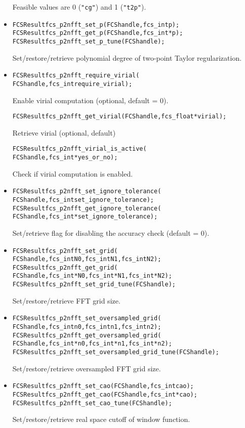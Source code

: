 \begin{itemize}
    Feasible values are 0 (\verb!"cg"!) and 1 (\verb!"t2p"!).
  \item
\begin{alltt}
FCSResult fcs_p2nfft_set_p(FCS handle, fcs_int p);
FCSResult fcs_p2nfft_get_p(FCS handle, fcs_int* p);
FCSResult fcs_p2nfft_set_p_tune(FCS handle);
\end{alltt}
    Set/restore/retrieve polynomial degree of two-point Taylor regularization.
  \item
\begin{alltt}
FCSResult fcs_p2nfft_require_virial(
    FCS handle, fcs_int require_virial);
\end{alltt}
    Enable virial computation (optional, default = 0).
\begin{alltt}
FCSResult fcs_p2nfft_get_virial(FCS handle, fcs_float* virial);
\end{alltt}
    Retrieve virial (optional, default)
\begin{alltt}
FCSResult fcs_p2nfft_virial_is_active(
    FCS handle, fcs_int* yes_or_no);
\end{alltt}
    Check if virial computation is enabled.
  \item
\begin{alltt}
FCSResult fcs_p2nfft_set_ignore_tolerance(
    FCS handle, fcs_int set_ignore_tolerance);
FCSResult fcs_p2nfft_get_ignore_tolerance(
    FCS handle, fcs_int* set_ignore_tolerance);
\end{alltt}
    Set/retrieve flag for disabling the accuracy check (default = 0).
  \item
\begin{alltt}
FCSResult fcs_p2nfft_set_grid(
    FCS handle, fcs_int N0, fcs_int N1, fcs_int N2);
FCSResult fcs_p2nfft_get_grid(
    FCS handle, fcs_int* N0, fcs_int* N1, fcs_int* N2);
FCSResult fcs_p2nfft_set_grid_tune(FCS handle);
\end{alltt}
    Set/restore/retrieve FFT grid size.
  \item
\begin{alltt}
FCSResult fcs_p2nfft_set_oversampled_grid(
    FCS handle, fcs_int n0, fcs_int n1, fcs_int n2);
FCSResult fcs_p2nfft_get_oversampled_grid(
    FCS handle, fcs_int* n0, fcs_int* n1, fcs_int* n2);
FCSResult fcs_p2nfft_set_oversampled_grid_tune(FCS handle);
\end{alltt}
    Set/restore/retrieve oversampled FFT grid size.
  \item
\begin{alltt}
FCSResult fcs_p2nfft_set_cao(FCS handle, fcs_int cao);
FCSResult fcs_p2nfft_get_cao(FCS handle, fcs_int* cao);
FCSResult fcs_p2nfft_set_cao_tune(FCS handle);
\end{alltt}
    Set/restore/retrieve real space cutoff of window function.
\end{itemize}

